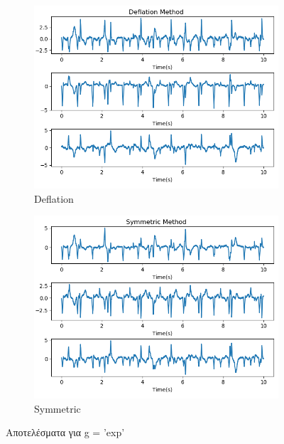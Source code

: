 \begin{figure}[H]
    \centering
    \begin{subfigure}{0.48 \textwidth}
        \centering
       \includegraphics[width=\textwidth]{biosignals/aami_exp_def.png} \en
        \caption{Deflation} \gr
        \label{fig:5.15a}
    \end{subfigure}
    \hfill
    \begin{subfigure}{0.48 \textwidth}
        \centering
       \includegraphics[width=\textwidth]{biosignals/aami_exp_sym.png} \en
        \en
        \caption{Symmetric} \gr
        \label{fig:5.15b}
    \end{subfigure}
    \gr
    \caption{Αποτελέσματα για \en g = 'exp' \gr}
\end{figure}
